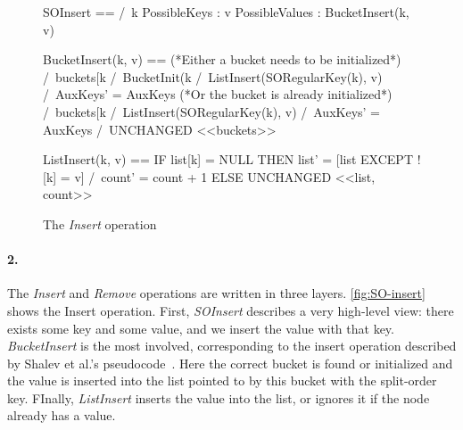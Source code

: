 \documentclass{uit-thesis}
\begin{document}
\begin{figure}
\begin{tla}
SOInsert == /\  \E k \in PossibleKeys :
                \E v \in PossibleValues :
                    BucketInsert(k, v)

BucketInsert(k, v) ==
(*Either a bucket needs to be initialized*)
    \/  /\ buckets[k %
        /\ BucketInit(k %
        /\ ListInsert(SORegularKey(k), v)
        /\ AuxKeys' = AuxKeys                       
    (*Or the bucket is already initialized*)
    \/  /\ buckets[k %
        /\ ListInsert(SORegularKey(k), v)
        /\ AuxKeys' = AuxKeys 
        /\ UNCHANGED <<buckets>>

ListInsert(k, v) == IF list[k] = NULL
                THEN list' = [list EXCEPT ![k] = v] /\ count' = count + 1
                ELSE UNCHANGED <<list, count>>

\end{tla} 
\begin{tlatex}
%
%
%
\@pvspace{8.0pt}%
%
\@x{}%
%
\@xx{}%
%
%
%
%
%
\@xx{}%
%
%
%
\@pvspace{8.0pt}%
%
%
\@pvspace{8.0pt}%
\end{tlatex}
\caption{The \textit{Insert} operation}
\label{fig:SO-insert}
\end{figure}
\paragraph{2.}The \textit{Insert} and \textit{Remove} operations are written in three layers. \autoref{fig:SO-insert} shows the Insert operation. First, \textit{SOInsert} describes a very high-level view: there exists some key and some value, and we insert the value with that key. \textit{BucketInsert} is the most involved, corresponding to the insert operation described by Shalev et al.'s pseudocode~\cite{Shalev2006}. Here the correct bucket is found or initialized and the value is inserted into the list pointed to by this bucket with the split-order key. FInally, \textit{ListInsert} inserts the value into the list, or ignores it if the node already has a value.
\end{document}
